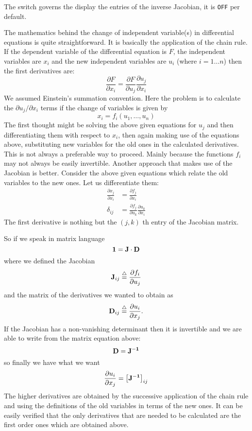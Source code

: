\hypertarget{switch:DISPJACOBIAN}{}
The switch  governs the display the entries of the inverse Jacobian,
it is \texttt{OFF} per default.

The mathematics behind the change of independent variable(s) in differential
equations is quite straightforward. It is basically the application of the
chain rule. If the dependent variable of the differential equation is $F$,
the independent variables are $x_{i}$ and the new independent variables are
$u_{i}$ (where ${\scriptstyle i=1\ldots n}$) then the first derivatives are:
\[
    \frac{\partial F}{\partial x_{i}} = \frac{\partial F}{\partial u_{j}}
                                        \frac{\partial u_{j}}{\partial x_{i}}
\]
We assumed Einstein's summation convention. Here the problem is to
calculate the $\partial u_{j}/\partial x_{i}$ terms if the change of variables
is given by
\[
    x_{i} = f_{i}(u_{1},\ldots,u_{n})
\]
The first thought might be solving the above given equations for $u_{j}$ and
then differentiating them with respect to $x_{i}$, then again making use of the
equations above, substituting new variables for the old ones in the calculated
derivatives. This is not always a  preferable way to proceed. Mainly because
the functions $f_{i}$ may not always be easily invertible. Another approach
that makes use of the Jacobian is better. Consider the above given equations
which relate the old variables to the new ones. Let us differentiate them:
\begin{align*}
  \frac{\partial x_{j}}{\partial x_{i}} & =
        \frac{\partial f_{j}}{\partial x_{i}}   \\
  \delta_{ij} & =
        \frac{\partial f_{j}}{\partial u_{k}}
        \frac{\partial u_{k}}{\partial x_{i}}
\end{align*}
The first derivative is nothing but the $(j,k)$ th entry of the Jacobian matrix.

So if we speak in matrix language
\[ {\bf 1 = J \cdot D} \]
where we defined the Jacobian
\[ {\bf J}_{ij} \stackrel{\triangle}{=}  \frac{\partial f_{i}}{\partial u_{j}} \]
and the matrix of the derivatives we wanted to obtain as
\[ {\bf D}_{ij} \stackrel{\triangle}{=}  \frac{\partial u_{i}}{\partial x_{j}}. \]
If the Jacobian has a non-vanishing determinant then it is invertible and
we are able to write from the matrix equation above:
\[ {\bf  D = J^{-1}} \]
so finally we have what we want
\[
   \frac{\partial u_{i}}{\partial x_{j}} = \left[{\bf J^{-1}}\right]_{ij}
\]
The higher derivatives are obtained by the successive application of the chain
rule and using the definitions of the old variables in terms of the new ones. It
can be easily verified that the only derivatives that are needed to be
calculated are the first order ones which are obtained above.

